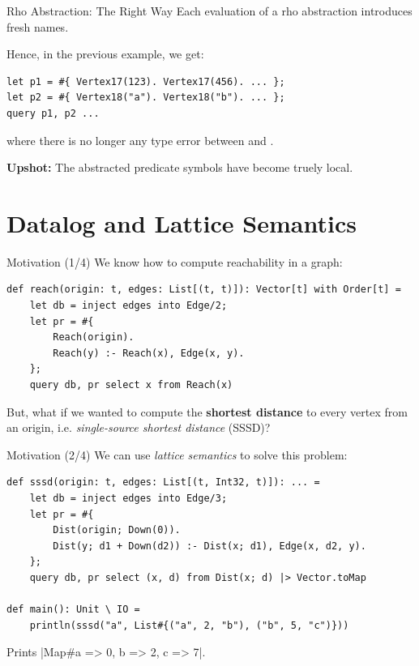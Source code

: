 \begin{frame}[fragile]{Rho Abstraction: The Right Way}
Each evaluation of a rho abstraction introduces fresh names.

Hence, in the previous example, we get:

\begin{lstlisting}[language=flix, xleftmargin=0.8cm]
let p1 = #{ Vertex17(123). Vertex17(456). ... };
let p2 = #{ Vertex18("a"). Vertex18("b"). ... };
query p1, p2 ...
\end{lstlisting}

where there is no longer any type error between  and .

\pause

\textbf{Upshot:} The abstracted predicate symbols have become truely local.
\end{frame}

\section{Datalog and Lattice Semantics}

\begin{frame}[fragile]{Motivation (1/4)}
We know how to compute reachability in a graph:

\begin{lstlisting}[language=flix, xleftmargin=0.8cm]
def reach(origin: t, edges: List[(t, t)]): Vector[t] with Order[t] = 
    let db = inject edges into Edge/2;
    let pr = #{
        Reach(origin).
        Reach(y) :- Reach(x), Edge(x, y).
    };
    query db, pr select x from Reach(x)
\end{lstlisting}

\pause

But, what if we wanted to compute the \textbf{shortest distance} to every vertex
from an origin, i.e. \emph{single-source shortest distance} (SSSD)?
\end{frame}

\begin{frame}[fragile]{Motivation (2/4)}
We can use \emph{lattice semantics} to solve this problem:

\begin{lstlisting}[language=flix, xleftmargin=0.8cm]
def sssd(origin: t, edges: List[(t, Int32, t)]): ... = 
    let db = inject edges into Edge/3;
    let pr = #{
        Dist(origin; Down(0)).
        Dist(y; d1 + Down(d2)) :- Dist(x; d1), Edge(x, d2, y).
    };
    query db, pr select (x, d) from Dist(x; d) |> Vector.toMap

def main(): Unit \ IO = 
    println(sssd("a", List#{("a", 2, "b"), ("b", 5, "c")}))
\end{lstlisting}

Prints \Code|Map#{a => 0, b => 2, c => 7}|.
\end{frame}

